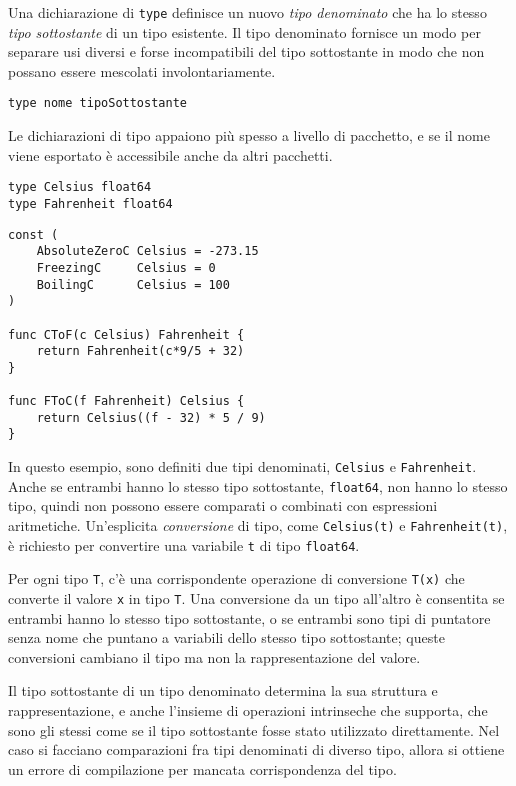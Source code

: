 Una dichiarazione di \verb|type| definisce un nuovo \textit{tipo denominato} che ha lo stesso \textit{tipo sottostante} di un tipo esistente.
Il tipo denominato fornisce un modo per separare usi diversi e forse incompatibili del tipo sottostante in modo che non possano essere mescolati involontariamente.
\begin{lstlisting}[label={lst:lstlisting1-5.1}]
type nome tipoSottostante
\end{lstlisting}
Le dichiarazioni di tipo appaiono più spesso a livello di pacchetto, e se il nome viene esportato è accessibile anche da altri pacchetti.
\begin{lstlisting}[frame=single, label={lst:lstlisting1-5.2}]
type Celsius float64
type Fahrenheit float64
\end{lstlisting}
\begin{lstlisting}[frame=single, label={lst:lstlisting1-5.3}]
const (
    AbsoluteZeroC Celsius = -273.15
    FreezingC	  Celsius = 0
    BoilingC	  Celsius = 100
)

func CToF(c Celsius) Fahrenheit {
    return Fahrenheit(c*9/5 + 32)
}

func FToC(f Fahrenheit) Celsius {
    return Celsius((f - 32) * 5 / 9)
}
\end{lstlisting}
In questo esempio, sono definiti due tipi denominati, \verb|Celsius| e \verb|Fahrenheit|.
Anche se entrambi hanno lo stesso tipo sottostante, \verb|float64|, non hanno lo stesso tipo, quindi non possono essere comparati o combinati con espressioni aritmetiche.
Un'esplicita \textit{conversione} di tipo, come \verb|Celsius(t)| e \verb|Fahrenheit(t)|, è richiesto per convertire una variabile \verb|t| di tipo \verb|float64|.

Per ogni tipo \verb|T|, c'è una corrispondente operazione di conversione \verb|T(x)| che converte il valore \verb|x| in tipo \verb|T|.
Una conversione da un tipo all'altro è consentita se entrambi hanno lo stesso tipo sottostante, o se entrambi sono tipi di puntatore senza nome che puntano a variabili dello stesso tipo sottostante;
queste conversioni cambiano il tipo ma non la rappresentazione del valore.

Il tipo sottostante di un tipo denominato determina la sua struttura e rappresentazione, e anche l'insieme di operazioni intrinseche che supporta, che sono gli stessi come se il tipo sottostante fosse stato utilizzato direttamente.
Nel caso si facciano comparazioni fra tipi denominati di diverso tipo, allora si ottiene un errore di compilazione per mancata corrispondenza del tipo.

